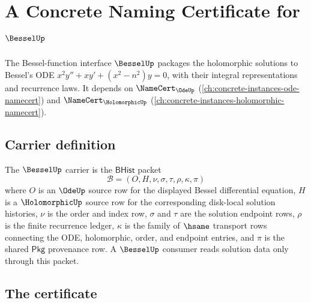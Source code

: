\chapter{A Concrete Naming Certificate for $\BesselUp$}
\label{ch:concrete-instances-bessel-namecert}

The Bessel-function interface $\BesselUp$ packages the holomorphic solutions to Bessel's ODE $x^2 y'' + x y' + (x^2 - n^2) y = 0$, with their integral representations and recurrence laws. It depends on $\NameCert_{\OdeUp}$ (\autoref{ch:concrete-instances-ode-namecert}) and $\NameCert_{\HolomorphicUp}$ (\autoref{ch:concrete-instances-holomorphic-namecert}).

\section{Carrier definition}
\label{sec:bessel-carrier}

\begin{definition}
\label{def:bessel-bhist-carrier-packet}
The $\BesselUp$ carrier is the $\mathsf{BHist}$ packet
$$
\mathcal B=(O,H,\nu,\sigma,\tau,\rho,\kappa,\pi)
$$
where $O$ is an $\OdeUp$ source row for the displayed Bessel differential
equation, $H$ is a $\HolomorphicUp$ source row for the corresponding
disk-local solution histories, $\nu$ is the order and index row, $\sigma$ and
$\tau$ are the solution endpoint rows, $\rho$ is the finite recurrence ledger,
$\kappa$ is the family of $\hsame$ transport rows connecting the ODE,
holomorphic, order, and endpoint entries, and $\pi$ is the shared
$\mathsf{Pkg}$ provenance row. A $\BesselUp$ consumer reads solution data only
through this packet.
\end{definition}

\section{The certificate}
\label{sec:bessel-certificate}

